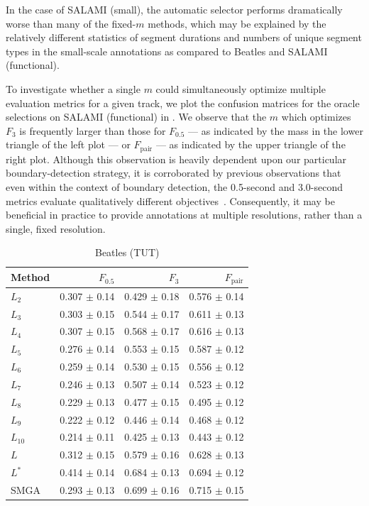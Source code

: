 \documentclass{article}
\begin{document}
In the case of SALAMI (small), the automatic selector performs dramatically worse than
many of the fixed-$m$ methods, which may be explained by the relatively different
statistics of segment durations and numbers of unique segment types in the small-scale
annotations as compared to Beatles and SALAMI (functional).

To investigate whether a single $m$ could simultaneously optimize multiple evaluation
metrics for a given track, we plot the confusion matrices for the oracle selections on
SALAMI (functional) in .  We observe that the
$m$ which optimizes $F_3$ is frequently larger than those for $F_0.5$ --- as indicated by
the mass in the lower triangle of the left plot --- or $F_\text{pair}$  --- as 
indicated by the upper triangle of the right plot.  
Although this observation is heavily dependent upon our particular boundary-detection
strategy, it is corroborated by previous observations that even within the context of 
boundary detection, the 0.5-second and 3.0-second metrics evaluate qualitatively 
different  objectives~\cite{smith2013meta}.  Consequently, it may be beneficial in 
practice to provide annotations at multiple resolutions, rather than a single, fixed 
resolution.

\begin{table}[t]
\centering
\caption{ Beatles (TUT)\label{results:beatles}}
\begin{tabular}{lrrr}
\toprule
Method & $F_{0.5}$ & $F_3$ & $F_\text{pair}$\\
\midrule
$L_2$   & 0.307 $\pm$ 0.14 & 0.429 $\pm$ 0.18   & 0.576 $\pm$ 0.14\\
$L_3$   & 0.303 $\pm$ 0.15 & 0.544 $\pm$ 0.17   & 0.611 $\pm$ 0.13\\
$L_4$   & 0.307 $\pm$ 0.15 & 0.568 $\pm$ 0.17   & 0.616 $\pm$ 0.13\\
$L_5$   & 0.276 $\pm$ 0.14 & 0.553 $\pm$ 0.15   & 0.587 $\pm$ 0.12\\
$L_6$   & 0.259 $\pm$ 0.14 & 0.530 $\pm$ 0.15   & 0.556 $\pm$ 0.12\\
$L_7$   & 0.246 $\pm$ 0.13 & 0.507 $\pm$ 0.14   & 0.523 $\pm$ 0.12\\
$L_8$   & 0.229 $\pm$ 0.13 & 0.477 $\pm$ 0.15   & 0.495 $\pm$ 0.12\\
$L_9$   & 0.222 $\pm$ 0.12 & 0.446 $\pm$ 0.14   & 0.468 $\pm$ 0.12\\
$L_{10}$& 0.214 $\pm$ 0.11 & 0.425 $\pm$ 0.13   & 0.443 $\pm$ 0.12\\
\midrule
$L$     & 0.312 $\pm$ 0.15 & 0.579 $\pm$ 0.16   & 0.628 $\pm$ 0.13\\
$L^*$   & 0.414 $\pm$ 0.14 & 0.684 $\pm$ 0.13   & 0.694 $\pm$ 0.12\\
\midrule
SMGA    & 0.293 $\pm$ 0.13 & 0.699 $\pm$ 0.16   & 0.715 $\pm$ 0.15\\
\bottomrule
\end{tabular}
\end{table}
\end{document}
